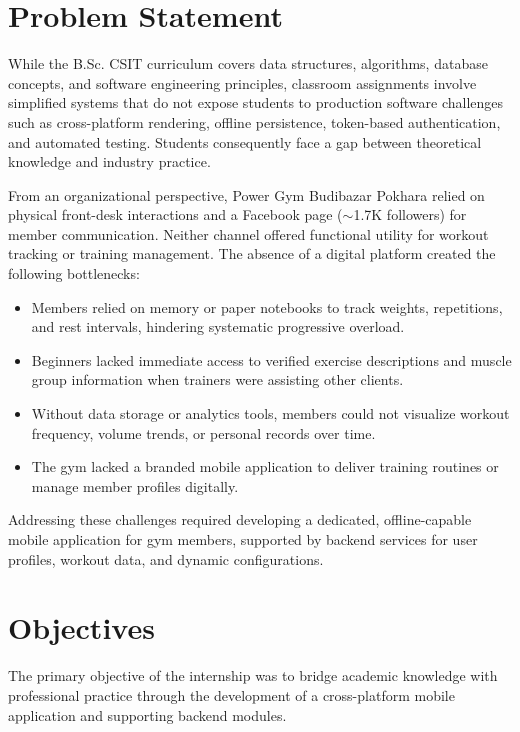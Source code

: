 \section{Problem Statement}
While the B.Sc. CSIT curriculum covers data structures, algorithms, database concepts, and software engineering principles, classroom assignments involve simplified systems that do not expose students to production software challenges such as cross-platform rendering, offline persistence, token-based authentication, and automated testing. Students consequently face a gap between theoretical knowledge and industry practice.

From an organizational perspective, Power Gym Budibazar Pokhara relied on physical front-desk interactions and a Facebook page ($\sim$1.7K followers) for member communication. Neither channel offered functional utility for workout tracking or training management. The absence of a digital platform created the following bottlenecks:
\begin{itemize}
    \item Members relied on memory or paper notebooks to track weights, repetitions, and rest intervals, hindering systematic progressive overload.
    \item Beginners lacked immediate access to verified exercise descriptions and muscle group information when trainers were assisting other clients.
    \item Without data storage or analytics tools, members could not visualize workout frequency, volume trends, or personal records over time.
    \item The gym lacked a branded mobile application to deliver training routines or manage member profiles digitally.
\end{itemize}

Addressing these challenges required developing a dedicated, offline-capable mobile application for gym members, supported by backend services for user profiles, workout data, and dynamic configurations.

\section{Objectives}
The primary objective of the internship was to bridge academic knowledge with professional practice through the development of a cross-platform mobile application and supporting backend modules.

